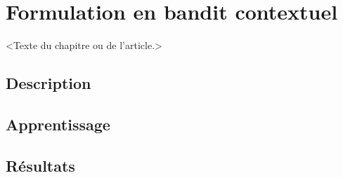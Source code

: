 \chapter{Formulation en bandit contextuel}
\label{chap:bandits}                   %

<Texte du chapitre ou de l'article.>

\section{Description}

\section{Apprentissage}

\section{Résultats}
